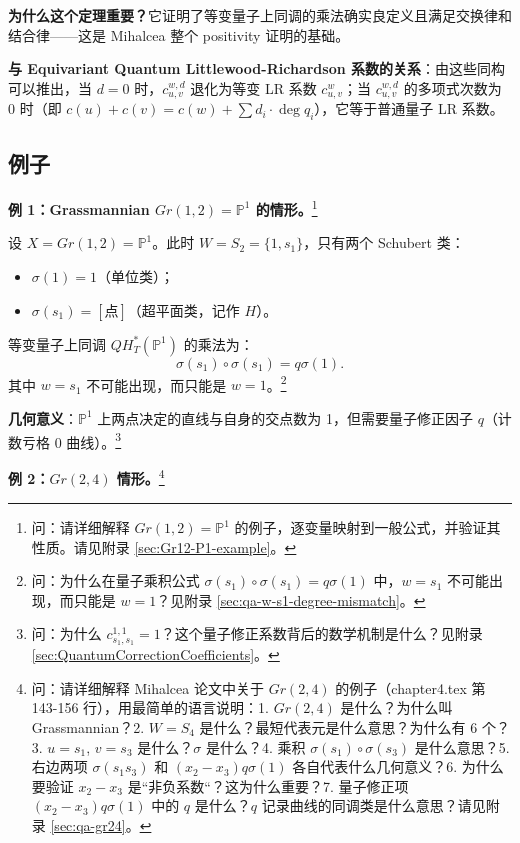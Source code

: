 \textbf{为什么这个定理重要？}它证明了等变量子上同调的乘法确实良定义且满足交换律和结合律——这是 Mihalcea 整个 positivity 证明的基础。

\textbf{与 Equivariant Quantum Littlewood-Richardson 系数的关系}：由这些同构可以推出，当 $d = 0$ 时，$c_{u,v}^{w,d}$ 退化为等变 LR 系数 $c_{u,v}^w$；当 $c_{u,v}^{w,d}$ 的多项式次数为 0 时（即 $c(u) + c(v) = c(w) + \sum d_i \cdot \deg q_i$），它等于普通量子 LR 系数。

\subsection{例子}

\textbf{例 1：Grassmannian $Gr(1,2) = \mathbb{P}^1$ 的情形。}\footnote{问：请详细解释 $Gr(1,2) = \mathbb{P}^1$ 的例子，逐变量映射到一般公式，并验证其性质。请见附录 \cref{sec:Gr12-P1-example}。}

设 $X = Gr(1,2) = \mathbb{P}^1$。此时 $W = S_2 = \{1, s_1\}$，只有两个 Schubert 类：

\begin{itemize}
\item $\sigma(1) = 1$（单位类）；
\item $\sigma(s_1) = [\text{点}]$（超平面类，记作 $H$）。
\end{itemize}

等变量子上同调 $QH_T^*(\mathbb{P}^1)$ 的乘法为：
\begin{equation}
\sigma(s_1) \circ \sigma(s_1) = q \sigma(1).
\label{eq:P1-quantum-product}
\end{equation}
其中 $w = s_1$ 不可能出现，而只能是 $w = 1$。\footnote{问：为什么在量子乘积公式 $\sigma(s_1) \circ \sigma(s_1) = q \sigma(1)$ 中，$w = s_1$ 不可能出现，而只能是 $w = 1$？见附录 \cref{sec:qa-w-s1-degree-mismatch}。}

\textbf{几何意义}：$\mathbb{P}^1$ 上两点决定的直线与自身的交点数为 1，但需要量子修正因子 $q$（计数亏格 0 曲线）。\footnote{问：为什么 $c_{s_1,s_1}^{1,1} = 1$？这个量子修正系数背后的数学机制是什么？见附录 \cref{sec:QuantumCorrectionCoefficients}。}

\textbf{例 2：$Gr(2,4)$ 情形。}\footnote{问：请详细解释 Mihalcea 论文中关于 $Gr(2,4)$ 的例子（chapter4.tex 第 143-156 行），用最简单的语言说明：1. $Gr(2,4)$ 是什么？为什么叫 Grassmannian？2. $W = S_4$ 是什么？最短代表元是什么意思？为什么有 6 个？3. $u = s_1$, $v = s_3$ 是什么？$\sigma$ 是什么？4. 乘积 $\sigma(s_1) \circ \sigma(s_3)$ 是什么意思？5. 右边两项 $\sigma(s_1 s_3)$ 和 $(x_2 - x_3) q \sigma(1)$ 各自代表什么几何意义？6. 为什么要验证 $x_2 - x_3$ 是``非负系数``？这为什么重要？7. 量子修正项 $(x_2 - x_3) q \sigma(1)$ 中的 $q$ 是什么？$q$ 记录曲线的同调类是什么意思？请见附录 \cref{sec:qa-gr24}。}

